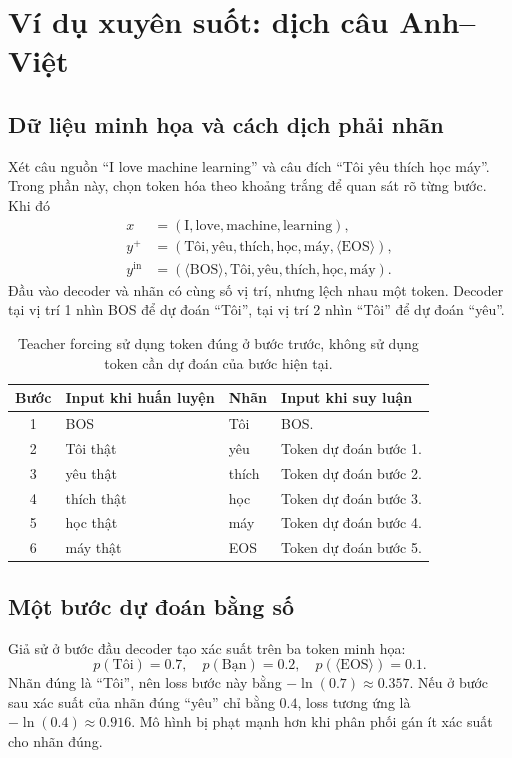 \documentclass[11pt,a4paper]{article}
\numberwithin{equation}{section}
\newcommand{\BOS}{\langle\mathrm{BOS}\rangle}
\newcommand{\EOS}{\langle\mathrm{EOS}\rangle}
\begin{document}
\section{Ví dụ xuyên suốt: dịch câu Anh--Việt}
\subsection{Dữ liệu minh họa và cách dịch phải nhãn}
Xét câu nguồn ``I love machine learning'' và câu đích ``Tôi yêu thích học máy''. Trong phần này, chọn token hóa theo khoảng trắng để quan sát rõ từng bước. Khi đó
\begin{align*}
x&=(\text{I},\text{love},\text{machine},\text{learning}),\\
y^+&=(\text{Tôi},\text{yêu},\text{thích},\text{học},\text{máy},\EOS),\\
y^{\mathrm{in}}&=(\BOS,\text{Tôi},\text{yêu},\text{thích},\text{học},\text{máy}).
\end{align*}
Đầu vào decoder và nhãn có cùng số vị trí, nhưng lệch nhau một token. Decoder tại vị trí 1 nhìn BOS để dự đoán ``Tôi'', tại vị trí 2 nhìn ``Tôi'' để dự đoán ``yêu''.

\begin{table}[H]
\centering\small
\begin{tabularx}{\linewidth}{@{}cp{3.1cm}p{2.6cm}Y@{}}
\toprule{}Bước & Input khi huấn luyện & Nhãn & Input khi suy luận\\ & BOS & Tôi & BOS.\\
2 & Tôi thật & yêu & Token dự đoán bước 1.\\
3 & yêu thật & thích & Token dự đoán bước 2.\\
4 & thích thật & học & Token dự đoán bước 3.\\
5 & học thật & máy & Token dự đoán bước 4.\\
6 & máy thật & EOS & Token dự đoán bước 5.\\
\bottomrule
\end{tabularx}
\caption{Teacher forcing sử dụng token đúng ở bước trước, không sử dụng token cần dự đoán của bước hiện tại.}
\end{table}

\subsection{Một bước dự đoán bằng số}
Giả sử ở bước đầu decoder tạo xác suất trên ba token minh họa:
\begin{equation*}
p(\text{Tôi})=0.7,\quad p(\text{Bạn})=0.2,\quad p(\EOS)=0.1.
\end{equation*}
Nhãn đúng là ``Tôi'', nên loss bước này bằng $-\ln(0.7)\approx0.357$. Nếu ở bước sau xác suất của nhãn đúng ``yêu'' chỉ bằng $0.4$, loss tương ứng là $-\ln(0.4)\approx0.916$. Mô hình bị phạt mạnh hơn khi phân phối gán ít xác suất cho nhãn đúng.
\end{document}
